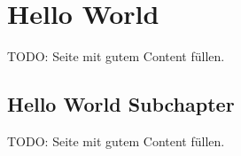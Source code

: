 \section{Hello World}

TODO: Seite mit gutem Content füllen.

\newpage

\subsection{Hello World Subchapter}

TODO: Seite mit gutem Content füllen.

